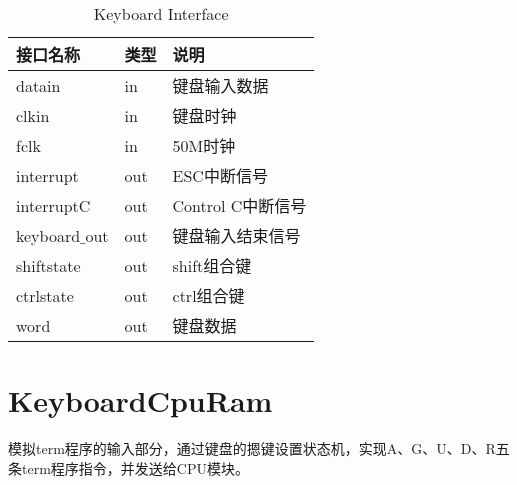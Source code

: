 \begin{center}
\renewcommand{\arraystretch}{1.3}
\small
\begin{longtable}{|p{3cm}<{\centering}|p{1.4cm}<{\centering}|p{7cm}<{\centering}|}
\caption{Keyboard Interface}
\label{tab:treatments}\\
\hline
接口名称 & 类型 & 说明 \\
\hline
datain & in & 键盘输入数据 \\
\hline
clkin & in & 键盘时钟 \\
\hline
fclk & in & 50M时钟 \\
\hline
interrupt & out & ESC中断信号 \\
\hline
interruptC & out & Control C中断信号 \\
\hline
keyboard$\_$out & out & 键盘输入结束信号 \\
\hline
shiftstate & out & shift组合键 \\
\hline
ctrlstate & out & ctrl组合键\\
\hline
word & out & 键盘数据\\
\hline
\end{longtable}
\end{center}


\section{KeyboardCpuRam}

模拟term程序的输入部分，通过键盘的摁键设置状态机，实现A、G、U、D、R五条term程序指令，并发送给CPU模块。

